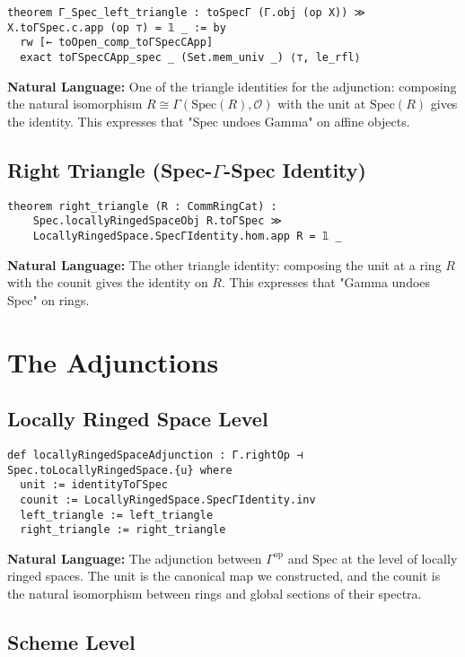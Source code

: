 \documentclass{article}
\theoremstyle{definition}
\begin{document}
\begin{lstlisting}
theorem Γ_Spec_left_triangle : toSpecΓ (Γ.obj (op X)) ≫ X.toΓSpec.c.app (op ⊤) = 𝟙 _ := by
  rw [← toOpen_comp_toΓSpecCApp]
  exact toΓSpecCApp_spec _ (Set.mem_univ _) ⟨⊤, le_rfl⟩
\end{lstlisting}

\textbf{Natural Language:} One of the triangle identities for the adjunction: composing the natural isomorphism $R \cong \Gamma(\mathrm{Spec}(R), \mathcal{O})$ with the unit at $\mathrm{Spec}(R)$ gives the identity. This expresses that "Spec undoes Gamma" on affine objects.

\subsection{Right Triangle (Spec-$\Gamma$-Spec Identity)}

\begin{lstlisting}
theorem right_triangle (R : CommRingCat) :
    Spec.locallyRingedSpaceObj R.toΓSpec ≫ 
    LocallyRingedSpace.SpecΓIdentity.hom.app R = 𝟙 _
\end{lstlisting}

\textbf{Natural Language:} The other triangle identity: composing the unit at a ring $R$ with the counit gives the identity on $R$. This expresses that "Gamma undoes Spec" on rings.

\section{The Adjunctions}

\subsection{Locally Ringed Space Level}

\begin{lstlisting}
def locallyRingedSpaceAdjunction : Γ.rightOp ⊣ Spec.toLocallyRingedSpace.{u} where
  unit := identityToΓSpec
  counit := LocallyRingedSpace.SpecΓIdentity.inv
  left_triangle := left_triangle
  right_triangle := right_triangle
\end{lstlisting}

\textbf{Natural Language:} The adjunction between $\Gamma^{\text{op}}$ and $\mathrm{Spec}$ at the level of locally ringed spaces. The unit is the canonical map we constructed, and the counit is the natural isomorphism between rings and global sections of their spectra.

\subsection{Scheme Level}
\end{document}
